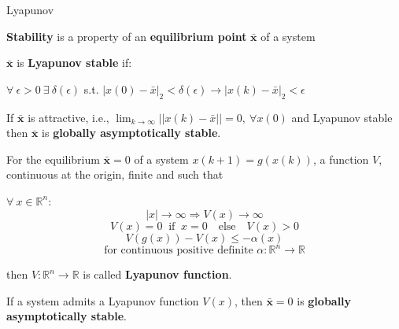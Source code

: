 
\begin{sstBreakBox}[Plum]{{
				\Large
				Lyapunov
			}\small
	}

	\begin{sstOnlyFrame}[Plum]
		\textbf{Stability} is a property of an
		\textbf{equilibrium point} $\bar{\mathbf{x}}$
		of a system
	\end{sstOnlyFrame}

	\begin{sstOnlyFrame}[Plum]
		\begin{definition}
			$\bar{\mathbf{x}}$ is \textbf{Lyapunov stable} if:

			$\forall\ \epsilon>0\ \exists\ \delta(\epsilon)$ s.t.
			$| x(0) - \bar{x} |_{\scriptscriptstyle 2}< \delta(\epsilon) \to
				| x(k) - \bar{x}|_{\scriptscriptstyle 2} < \epsilon$
		\end{definition}
	\end{sstOnlyFrame}

	\begin{sstOnlyFrame}[Plum]
		\begin{definition}
			If $\bar{\mathbf{x}}$ is attractive, i.e.,
			$\lim_{k\to\infty} ||x(k)-\bar{x}||=0,\ \forall x(0)$
			and Lyapunov stable
			then $\bar{\mathbf{x}}$ is \textbf{globally asymptotically stable}.
		\end{definition}
	\end{sstOnlyFrame}

	\begin{sstOnlyFrame}[Plum]
		\begin{definition}
			For the equilibrium $\bar{\mathbf{x}}=0$
			of a system $x(k+1)=g(x(k))$,
			a function $V$, continuous at the origin,
			finite and such that

			$\forall\ x\in \mathbb{R}^{n}$:
			\[
				|x|   \to\infty              \Rightarrow V(x)  \to\infty\]
			\[
				V(x)=0 \ \text{ if }\ x=0 \quad\text{else}\quad V(x)>0             \]
			\[
				V(g(x)) - V(x) \leq -\alpha(x)                          \]
			\[
				\text{for continuous positive definite }
				\alpha:\mathbb{R}^n\to \mathbb{R}
			\]

			then  $V:\mathbb{R}^n\to \mathbb{R}$
			is called \textbf{Lyapunov function}.
		\end{definition}
	\end{sstOnlyFrame}

	\begin{sstOnlyFrame}[Plum]
		\begin{theorem}
			If a system admits a Lyapunov function $V(x)$,
			then $\bar{\mathbf{x}} = 0$ is
			\textbf{globally asymptotically stable}.
		\end{theorem}
	\end{sstOnlyFrame}


\end{sstBreakBox}
